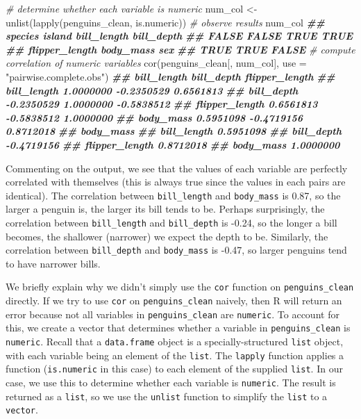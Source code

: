 \documentclass[
]{book}
\newenvironment{Shaded}{\begin{snugshade}}{\end{snugshade}}
\newcommand{\AttributeTok}[1]{\textcolor[rgb]{0.77,0.63,0.00}{#1}}
\newcommand{\CommentTok}[1]{\textcolor[rgb]{0.56,0.35,0.01}{\textit{#1}}}
\newcommand{\DocumentationTok}[1]{\textcolor[rgb]{0.56,0.35,0.01}{\textbf{\textit{#1}}}}
\newcommand{\FunctionTok}[1]{\textcolor[rgb]{0.00,0.00,0.00}{#1}}
\newcommand{\NormalTok}[1]{#1}
\newcommand{\OtherTok}[1]{\textcolor[rgb]{0.56,0.35,0.01}{#1}}
\newcommand{\StringTok}[1]{\textcolor[rgb]{0.31,0.60,0.02}{#1}}
\theoremstyle{definition}
\theoremstyle{definition}
\theoremstyle{definition}
\theoremstyle{definition}
\theoremstyle{remark}
\begin{document}
\begin{Shaded}
\begin{Highlighting}[]
\CommentTok{\# determine whether each variable is numeric}
\NormalTok{num\_col }\OtherTok{\textless{}{-}} \FunctionTok{unlist}\NormalTok{(}\FunctionTok{lapply}\NormalTok{(penguins\_clean, is.numeric))}
\CommentTok{\# observe results}
\NormalTok{num\_col}
\DocumentationTok{\#\#        species         island    bill\_length     bill\_depth }
\DocumentationTok{\#\#          FALSE          FALSE           TRUE           TRUE }
\DocumentationTok{\#\# flipper\_length      body\_mass            sex }
\DocumentationTok{\#\#           TRUE           TRUE          FALSE}
\CommentTok{\# compute correlation of numeric variables}
\FunctionTok{cor}\NormalTok{(penguins\_clean[, num\_col], }\AttributeTok{use =} \StringTok{"pairwise.complete.obs"}\NormalTok{)}
\DocumentationTok{\#\#                bill\_length bill\_depth flipper\_length}
\DocumentationTok{\#\# bill\_length      1.0000000 {-}0.2350529      0.6561813}
\DocumentationTok{\#\# bill\_depth      {-}0.2350529  1.0000000     {-}0.5838512}
\DocumentationTok{\#\# flipper\_length   0.6561813 {-}0.5838512      1.0000000}
\DocumentationTok{\#\# body\_mass        0.5951098 {-}0.4719156      0.8712018}
\DocumentationTok{\#\#                 body\_mass}
\DocumentationTok{\#\# bill\_length     0.5951098}
\DocumentationTok{\#\# bill\_depth     {-}0.4719156}
\DocumentationTok{\#\# flipper\_length  0.8712018}
\DocumentationTok{\#\# body\_mass       1.0000000}
\end{Highlighting}
\end{Shaded}

Commenting on the output, we see that the values of each variable are perfectly correlated with themselves (this is always true since the values in each pairs are identical). The correlation between \texttt{bill\_length} and \texttt{body\_mass} is 0.87, so the larger a penguin is, the larger its bill tends to be. Perhaps surprisingly, the correlation between \texttt{bill\_length} and \texttt{bill\_depth} is -0.24, so the longer a bill becomes, the shallower (narrower) we expect the depth to be. Similarly, the correlation between \texttt{bill\_depth} and \texttt{body\_mass} is -0.47, so larger penguins tend to have narrower bills.

We briefly explain why we didn't simply use the \texttt{cor} function on \texttt{penguins\_clean} directly. If we try to use \texttt{cor} on \texttt{penguins\_clean} naively, then R will return an error because not all variables in \texttt{penguins\_clean} are \texttt{numeric}. To account for this, we create a vector that determines whether a variable in \texttt{penguins\_clean} is \texttt{numeric}. Recall that a \texttt{data.frame} object is a specially-structured \texttt{list} object, with each variable being an element of the \texttt{list}. The \texttt{lapply} function applies a function (\texttt{is.numeric} in this case) to each element of the supplied \texttt{list}. In our case, we use this to determine whether each variable is \texttt{numeric}. The result is returned as a \texttt{list}, so we use the \texttt{unlist} function to simplify the \texttt{list} to a \texttt{vector}.
\end{document}
